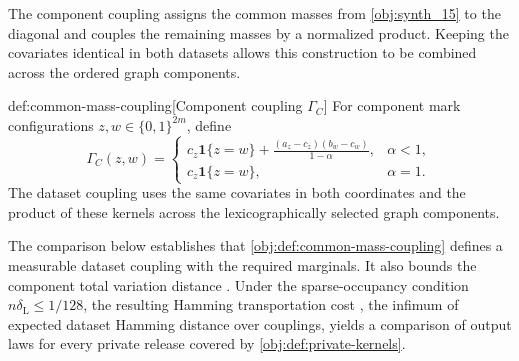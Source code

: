 The component coupling  assigns the common masses from \cref{obj:synth_15} to the diagonal and couples the remaining masses by a normalized product. Keeping the covariates identical in both datasets allows this construction to be combined across the ordered graph components.

\begin{definitionv}{def:common-mass-coupling}[Component coupling \(\Gamma_C\)]
For component mark configurations \(z,w\in\{0,1\}^{2m}\), define
\[
\Gamma_C(z,w)
=
\begin{cases}
\displaystyle
c_z\mathbf 1\{z=w\}
+\frac{(a_z-c_z)(b_w-c_w)}{1-\alpha},
&\alpha<1,\\[6pt]
c_z\mathbf 1\{z=w\},
&\alpha=1.
\end{cases}
\]
The dataset coupling uses the same covariates in both coordinates and the product of these kernels across the lexicographically selected graph components.
\end{definitionv}

The comparison below establishes that \cref{obj:def:common-mass-coupling} defines a measurable dataset coupling with the required marginals. It also bounds the component total variation distance . Under the sparse-occupancy condition \(n\delta_{\mathrm L}\le1/128\), the resulting Hamming transportation cost , the infimum of expected dataset Hamming distance over couplings, yields a comparison of output laws for every private release covered by \cref{obj:def:private-kernels}.

